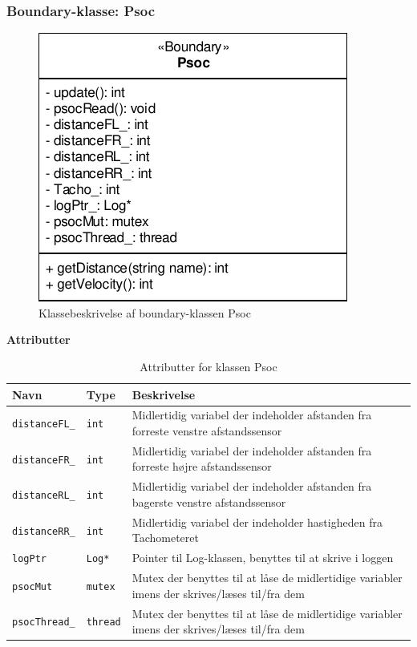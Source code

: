 \subsubsection{Boundary-klasse: Psoc}

\begin{figure}[h]
\centering
\includegraphics[]{../fig/diagrammer/bil/cd_psoc.pdf}
\caption{Klassebeskrivelse af boundary-klassen Psoc}
\label{fig:cd_psoc}

\end{figure}

\textbf{Attributter}

\begin{table}[h]
	\begin{tabularx}{\textwidth}{| Z | Z | L{10cm} |} \hline
	Navn & Type & Beskrivelse \\\hline
	\texttt{distanceFL\_}  & \texttt{int} 	& Midlertidig variabel der indeholder afstanden fra forreste venstre afstandssensor					\\\hline
	\texttt{distanceFR\_}  & \texttt{int} 	& Midlertidig variabel der indeholder afstanden fra forreste højre afstandssensor					\\\hline
	\texttt{distanceRL\_}  & \texttt{int} 	& Midlertidig variabel der indeholder afstanden fra bagerste venstre afstandssensor					\\\hline
	\texttt{distanceRR\_}  & \texttt{int} 	& Midlertidig variabel der indeholder hastigheden fra Tachometeret									\\\hline
	\texttt{logPtr} 	 & \texttt{Log*} 	& Pointer til Log-klassen, benyttes til at skrive i loggen											\\\hline
	\texttt{psocMut} 	 & \texttt{mutex} 	& Mutex der benyttes til at låse de midlertidige variabler imens der skrives/læses til/fra dem		\\\hline
	\texttt{psocThread\_} & \texttt{thread} 	& Mutex der benyttes til at låse de midlertidige variabler imens der skrives/læses til/fra dem	\\\hline
	\end{tabularx}
	\caption{Attributter for klassen Psoc}
	\label{table:attr_Psoc}
\end{table}
\clearpage

